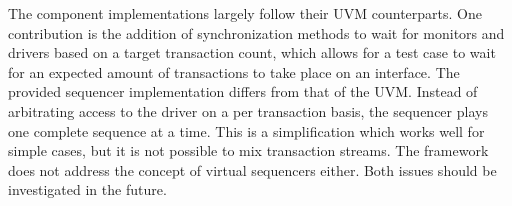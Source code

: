 
The component implementations largely follow their UVM counterparts. One contribution is the addition of synchronization methods to wait for monitors and drivers based on a target transaction count, which allows for a test case to wait for an expected amount of transactions to take place on an interface. The provided sequencer implementation differs from that of the UVM. Instead of arbitrating access to the driver on a per transaction basis, the sequencer plays one complete sequence at a time. This is a simplification which works well for simple cases, but it is not possible to mix transaction streams. The framework does not address the concept of virtual sequencers either. Both issues should be investigated in the future. 


